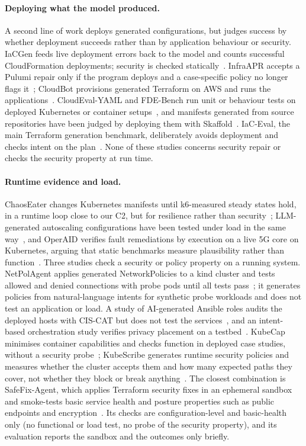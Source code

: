 \documentclass[10pt]{article}
\begin{document}
\paragraph{Deploying what the model produced.}
A second line of work deploys generated configurations, but judges success by whether deployment succeeds rather than
by application behaviour or security. IaCGen feeds live deployment errors back to the model and counts successful
CloudFormation deployments; security is checked statically~\cite{R0112}. InfraAPR accepts a Pulumi repair only if the
program deploys and a case-specific policy no longer flags it~\cite{R0856}; CloudBot provisions generated Terraform on
AWS and runs the applications~\cite{R0099}. CloudEval-YAML and FDE-Bench run unit or behaviour tests on deployed
Kubernetes or container setups~\cite{R0006,R0354}, and manifests generated from source repositories have been judged
by deploying them with Skaffold~\cite{R0806}. IaC-Eval, the main Terraform generation benchmark, deliberately
avoids deployment and checks intent on the plan~\cite{R0861}. None of these studies concerns security repair or checks
the security property at run time.

\paragraph{Runtime evidence and load.}
ChaosEater changes Kubernetes manifests until k6-measured steady states hold, in a runtime loop close to our C2, but for
resilience rather than security~\cite{R0170}; LLM-generated autoscaling configurations have been tested under load in
the same way~\cite{R0132}, and OperAID verifies fault remediations by execution on a live 5G core on Kubernetes,
arguing that static benchmarks measure plausibility rather than function~\cite{R0435}. Three studies check a security
or policy property on a running system. NetPolAgent applies
generated NetworkPolicies to a kind cluster and tests allowed and denied connections with probe pods until all tests
pass~\cite{R0772}; it generates policies from natural-language intents for synthetic probe workloads and does not test
an application or load. A study of AI-generated Ansible roles audits the deployed hosts with CIS-CAT but does not test the
services~\cite{R0865}, and an intent-based orchestration study verifies privacy placement on a testbed~\cite{R0410}.
KubeCap minimises container capabilities and checks function in deployed case studies, without a security
probe~\cite{R0397}; KubeScribe generates runtime security policies and measures whether the cluster accepts them and how
many expected paths they cover, not whether they block or break anything~\cite{R0755}. The closest combination is
SafeFix-Agent, which applies Terraform security fixes in an ephemeral sandbox and smoke-tests basic service health and
posture properties such as public endpoints and encryption~\cite{R0462}. Its checks are configuration-level and
basic-health only (no functional or load test, no probe of the security property), and its evaluation reports the
sandbox and the outcomes only briefly.
\end{document}
